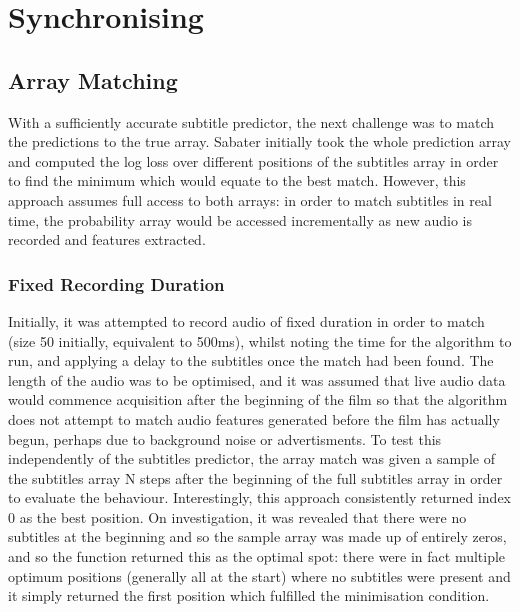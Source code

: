 
\chapter{Synchronising} %

\label{ChapterX} %


\section{Array Matching}
With a sufficiently accurate subtitle predictor, the next challenge was to match the predictions to the  true array. Sabater initially took the whole prediction array and computed the log loss over different positions of the subtitles array in order to find the minimum which would equate to the best match. However, this approach assumes full access to both arrays: in order to match subtitles in real time, the probability array would be accessed incrementally as new audio is recorded and features extracted. 

\subsection{Fixed Recording Duration}
Initially, it was attempted to record audio of fixed duration in order to match (size 50 initially, equivalent to 500ms), whilst noting the time for the algorithm to run, and applying a delay to the subtitles once the match had been found. The length of the audio was to be optimised, and it was assumed that live audio data would commence acquisition after the beginning of the film so that the algorithm does not attempt to match audio features generated before the film has actually begun, perhaps due to background noise or advertisments. To test this independently of the subtitles predictor, the array match was given a sample of the subtitles array N steps after the beginning of the full subtitles array in order to evaluate the behaviour. Interestingly, this approach consistently returned index 0 as the best position. On investigation, it was revealed that there were no subtitles at the beginning and so the sample array was made up of entirely zeros, and so the function returned this as the optimal spot: there were in fact multiple optimum positions (generally all at the start) where no subtitles were present and it simply returned the first position which fulfilled the minimisation condition. 

